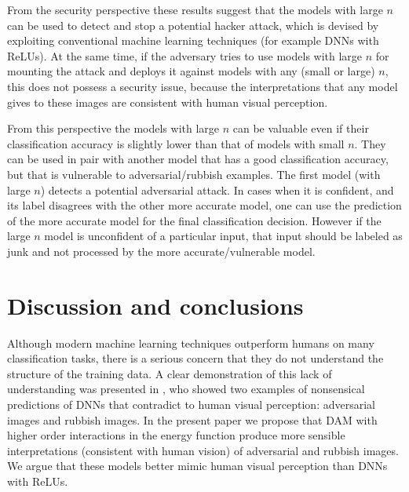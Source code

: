 \documentclass[12pt]{article} %
\begin{document}
From the security perspective these results suggest that the models with large $n$ can be used to detect and stop a potential hacker attack, which is devised by exploiting conventional machine learning techniques (for example DNNs with ReLUs). At the same time, if the adversary tries to use models with large $n$ for mounting the attack and deploys it against models with any (small or large) $n$, this does not possess a security issue, because the interpretations that any model gives to these images are consistent with human visual perception. 

From this perspective the models with large $n$ can be valuable even if their classification accuracy is slightly lower than that of models with small $n$. They can be used in pair with another model that has a good classification accuracy, but that is vulnerable to adversarial/rubbish examples. The first model (with large $n$) detects a potential adversarial attack. In cases when it is confident, and its label disagrees with the other more accurate model, one can use the prediction of the more accurate model for the final classification decision. However if the large $n$ model is unconfident of a particular input, that input should be labeled as junk and not processed by the more accurate/vulnerable model. 


\section{Discussion and conclusions}
Although modern machine learning techniques outperform humans on many classification tasks, there is a serious concern that they do not understand the structure of the training data. A clear demonstration of this lack of understanding was presented in \cite{Szegedy,Nguyen}, who showed two examples of nonsensical predictions of DNNs that contradict to human visual perception: adversarial images and rubbish images. In the present paper we propose that DAM with higher order interactions in the energy function produce more sensible interpretations (consistent with human vision) of adversarial and rubbish images. We argue that these models better mimic human visual perception than DNNs with ReLUs. 
\end{document}
